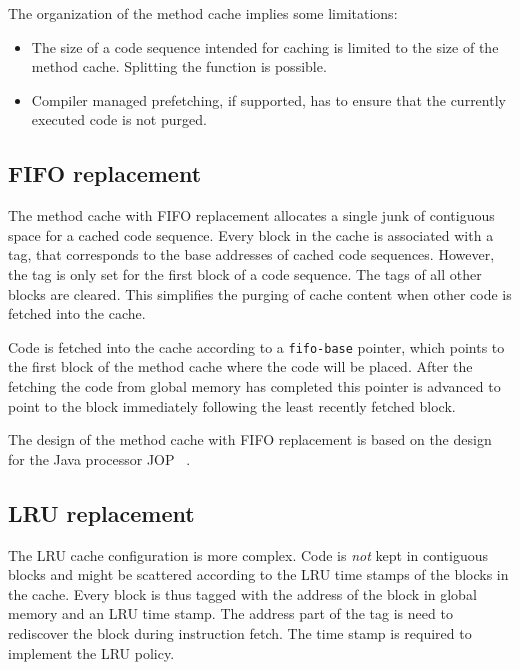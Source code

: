 \documentclass{IEEEtran}
\begin{document}
The organization of the method cache implies some limitations:
\begin{itemize}
  \item The size of a code sequence intended for caching is limited to the size
        of the method cache. Splitting the function is possible.
  \item Compiler managed prefetching, if supported, has to ensure that the
        currently executed code is not purged.
\end{itemize}

\subsection{FIFO replacement}

The method cache with FIFO replacement allocates a single junk of contiguous
space for a cached code sequence. Every block in the cache is associated with a
tag, that corresponds to the base addresses of cached code sequences. However,
the tag is only set for the first block of a code sequence. The tags of all
other blocks are cleared. This simplifies the purging of cache content when
other code is fetched into the cache.

Code is fetched into the cache according to a \texttt{fifo-base} pointer, which
points to the first block of the method cache where the code will be placed.
After the fetching the code from global memory has completed this pointer is
advanced to point to the block immediately following the least recently fetched
block.

The design of the method cache with FIFO replacement is based on the
design for the Java processor JOP~\cite{jop:jtres_cache} .

\subsection{LRU replacement}

The LRU cache configuration is more complex. Code is \emph{not} kept in
contiguous blocks and might be scattered according to the LRU time stamps of the
blocks in the cache. Every block is thus tagged with the address of the block
in global memory and an LRU time stamp. The address part of the tag is need to
rediscover the block during instruction fetch. The time stamp is required to
implement the LRU policy.
\end{document}
